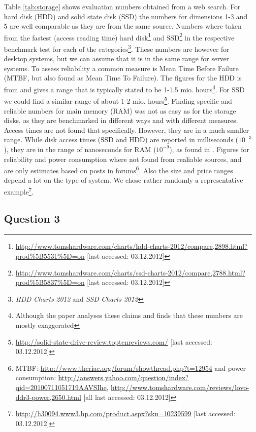 \documentclass[12pt,a4paper]{article}
\begin{document}
Table \ref{tab:storage} shows evaluation numbers obtained from a web search. For hard disk (HDD) and solid state disk (SSD) the numbers for dimensions 1-3 and 5 are well comparable as they are from the same source. Numbers where taken from the fastest (access reading time) hard disk\footnote{\url{http://www.tomshardware.com/charts/hdd-charts-2012/compare,2898.html?prod\%5B5531\%5D=on} [last accessed: 03.12.2012]} and SSD\footnote{\url{http://www.tomshardware.com/charts/ssd-charts-2012/compare,2788.html?prod\%5B5837\%5D=on} [last accessed: 03.12.2012]} in the respective benchmark test for each of the categories\footnote{\emph{HDD Charts 2012} and \emph{SSD Charts 2012}}. These numbers are however for desktop systems, but we can assume that it is in the same range for server systems. To assess reliability a common measure is Mean Time Before Failure (MTBF, but also found as Mean Time To Failure). The figures for the HDD is from \cite{Schroeder2007} and gives a range that is typically stated to be 1-1.5 mio. hours\footnote{Although the paper analyses these claims and finds that these numbers are mostly exaggerated}. For SSD we could find a similar range of about 1-2 mio. hours\footnote{\url{http://solid-state-drive-review.toptenreviews.com/} [last accessed: 03.12.2012]}. Finding specific and reliable numbers for main memory (RAM) was not as easy as for the storage disks, as they are benchmarked in different ways and with different measures. Access times are not found that specifically. However, they are in a much smaller range. While disk access times (SSD and HDD) are reported in milliseconds ($10^{-3}$), they are in the range of nanoseconds for RAM ($10^{-9}$), as found in \cite{Dean}. Figures for reliability and power consumption where not found from realiable sources, and are only estimates based on posts in forums\footnote{MTBF: \url{http://www.theriac.org/forum/showthread.php?t=12954} and power consumption: \url{http://answers.yahoo.com/question/index?qid=20100711051719AAVSIhe},
\url{http://www.tomshardware.com/reviews/lovo-ddr3-power,2650.html} [all last accessed: 03.12.2012]}. Also the size and price ranges depend a lot on the type of system. We chose rather randomly a representative example\footnote{\url{http://h30094.www3.hp.com/product.aspx?sku=10239599} [last accessed: 03.12.2012]}.


\subsection*{Question 3}
\label{sec:eq3}
\end{document}
